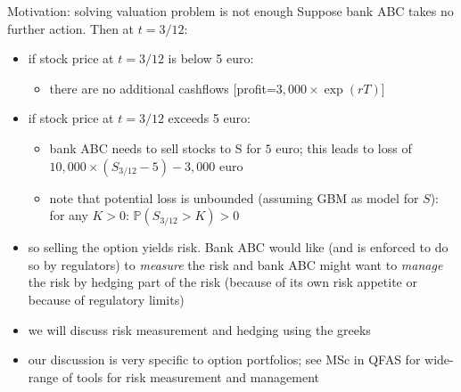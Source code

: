 \documentclass[pdf, handout]{beamer}
\begin{document}
\begin{frame}{Motivation: solving valuation problem is not enough}
Suppose bank ABC takes no further action. Then at $t=3/12$:
\begin{itemize}
\item if stock price at $t=3/12$ is below 5 euro:
\begin{itemize}
\item there are no additional cashflows [profit=$3,000\times\exp(rT)$] 
\end{itemize}
\item if stock price at $t=3/12$ exceeds 5 euro:
\begin{itemize}
\item bank ABC needs to sell stocks to S for $5$ euro; this leads to loss
of $10,000 \times (S_{3/12} -5) - 3,000$ euro
\item note that potential loss is unbounded (assuming GBM as model for $S$):  for any $K>0$:  $\mathbb{P}(S_{3/12} > K)>0$
\end{itemize}
\item so selling the option yields risk. Bank ABC would like (and is enforced to do so by regulators) to \emph{measure}  the risk
and bank ABC might want to \emph{manage} the risk by hedging part of the risk (because of its own risk appetite or because of regulatory limits)
\item we will discuss risk measurement and hedging using the greeks
\item our discussion is very specific to option portfolios; see MSc in QFAS for wide-range of tools for risk measurement and management
\end{itemize}
\end{frame}

%
%
\end{document}
